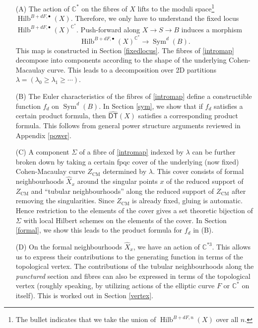 \documentclass{amsart}
\theoremstyle{definition}
\newcommand{\CC} {\mathbb{C}}          %
\newcommand{\Sym}{\operatorname{Sym}}
\newcommand{\Hilb}{\operatorname{Hilb}}
\newcommand{\DT}{\mathsf{DT}}
\newcommand{\CM}{\operatorname{CM}}
\newcommand{\DThat}{\widehat{\DT}}
\newcommand{\Xhat}{\widehat{X}}
\begin{document}
\begin{enumerate}
\item[(A)] The action of $\CC^*$ on the fibres of $X$ lifts to the
moduli space\footnote{The bullet indicates that we take the union of
$\Hilb^{B+dF,n}(X)$ over all $n$.}
$\Hilb^{B+dF,\bullet}(X)$. Therefore, we only have to understand the
fixed locus $\Hilb^{B+dF,\bullet}(X)^{\CC^*}$. Push-forward along $X
\rightarrow S \rightarrow B$ induces a morphism
\begin{equation} \label{intromap}
\Hilb^{B+dF,\bullet}(X)^{\CC^*} \rightarrow \Sym^d(B).
\end{equation}
This map is constructed in Section \ref{fixedlocus}. The fibres of
\eqref{intromap} decompose into components according to the shape of
the underlying Cohen-Macaulay curve. This leads to a decomposition
over 2D partitions $\lambda = (\lambda_0 \geq \lambda_1 \geq \cdots)$.
\item[(B)] The Euler characteristics of the fibres of \eqref{intromap}
define a constructible function $f_d$ on $\Sym^d(B)$. In Section
\ref{sym}, we show that if $f_d$ satisfies a certain product formula,
then $\DThat (X)$ satisfies a corresponding product formula. This
follows from general power structure arguments reviewed in Appendix
\ref{power}.
\item[(C)] A component $\Sigma$ of a fibre of \eqref{intromap} indexed
by $\lambda$ can be further broken down by taking a certain fpqc cover
of the underlying (now fixed) Cohen-Macaulay curve $Z_{\CM}$
determined by $\lambda$. This cover consists of formal neighbourhoods
$\Xhat _x$ around the singular points $x$ of the reduced support of
$Z_{\CM}$ and ``tubular neighbourhoods'' along the reduced support of
$Z_{\CM}$ after removing the singularities. Since $Z_{\CM}$ is already
fixed, gluing is automatic. Hence restriction to the elements of the
cover gives a set theoretic bijection of $\Sigma$ with local Hilbert
schemes on the elements of the cover. In Section \ref{formal}, we show
this leads to the product formula for $f_d$ in (B).
\item[(D)] On the formal neighbourhoods $\Xhat _x$, we have an action
of $\CC^{*3}$. This allows us to express their contributions to the
generating function in terms of the topological vertex. The
contributions of the tubular neighbourhoods along the \emph{punctured}
section and fibres can also be expressed in terms of the topological
vertex (roughly speaking, by utilizing actions of the elliptic curve
$F$ or $\CC^*$ on itself). This is worked out in Section \ref{vertex}.
\end{enumerate}
\end{document}
